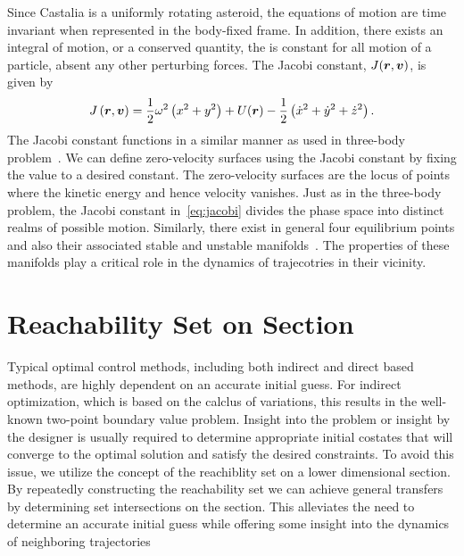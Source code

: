 \documentclass[]{aiaa-tc}%
\begin{document}
Since Castalia is a uniformly rotating asteroid, the equations of motion are time invariant when represented in the body-fixed frame.
In addition, there exists an integral of motion, or a conserved quantity, the is constant for all motion of a particle, absent any other perturbing forces.
The Jacobi constant, \( J (\bm{r} , \bm{v} ) \), is given by
\begin{align}\label{eq:jacobi}
    J \left( \bm{r}, \bm{v} \right) = \frac{1}{2} \omega^2 \left( x^2 + y^2 \right) + U(\bm{r}) - \frac{1}{2} \left( \dot{x}^2 + \dot{y}^2 + \dot{z}^2 \right) .
\end{align}
The Jacobi constant functions in a similar manner as used in three-body problem~\cite{szebehely1967}.
We can define zero-velocity surfaces using the Jacobi constant by fixing the value to a desired constant.
The zero-velocity surfaces are the locus of points where the kinetic energy and hence velocity vanishes.
Just as in the three-body problem, the Jacobi constant in~\cref{eq:jacobi} divides the phase space into distinct realms of possible motion.
Similarly, there exist in general four equilibrium points and also their associated stable and unstable manifolds~\cite{scheeres1996,scheeres1994}.
The properties of these manifolds play a critical role in the dynamics of trajecotries in their vicinity.

\section{Reachability Set on \Poincare Section}\label{sec:reachability}

Typical optimal control methods, including both indirect and direct based methods, are highly dependent on an accurate initial guess.
For indirect optimization, which is based on the calclus of variations, this results in the well-known two-point boundary value problem.
Insight into the problem or insight by the designer is usually required to determine appropriate initial costates that will converge to the optimal solution and satisfy the desired constraints.
To avoid this issue, we utilize the concept of the reachiblity set on a lower dimensional \Poincare section.
By repeatedly constructing the reachability set we can achieve general transfers by determining set intersections on the \Poincare section.
This alleviates the need to determine an accurate initial guess while offering some insight into the dynamics of neighboring trajectories
\end{document}
